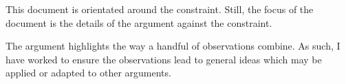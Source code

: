 \begin{note}
  This document is orientated around the constraint.
  Still, the focus of the document is the details of the argument against the constraint.

  The argument highlights the way a handful of observations combine.
  As such, I have worked to ensure the observations lead to general ideas which may be applied or adapted to other arguments.
\end{note}



